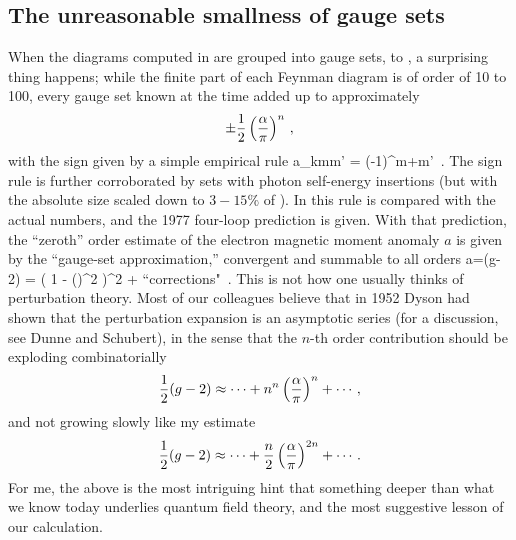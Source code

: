 \subsection{The unreasonable smallness of gauge sets}
\label{sect:gaugeSetsSmall}

When the diagrams computed in  are grouped into
gauge sets,  to ,
a surprising thing happens; while the
finite part of each Feynman diagram is of order of 10 to 100, every
 gauge set known at the time added up to approximately
$$
		   \pm {1 \over 2} \left(\frac{\alpha}{\pi}\right)^n
\,,
$$
with the sign given by a simple empirical rule
\beq
a_{kmm'} = (-1)^{m+m'}
\,.
The sign rule is further corroborated by sets with photon
self-energy insertions (but with the absolute size scaled down to
$3-15\%$ of ).
In  this rule is compared with the actual numbers,
and the 1977 four-loop prediction is given.
With that prediction, the ``zeroth'' order estimate of the electron
magnetic moment anomaly $a$ is given by the ``gauge-set
approximation,'' convergent and summable to all orders
\beq
a=(g-2) =   \frac{\alpha}{\pi}
           {\left( 1 - \left(\frac{\alpha}{\pi}\right)^2
			\right)^2
		      } + \mbox{``corrections"}
\,.
This is not how one usually thinks of perturbation theory. Most of our
colleagues believe that in 1952 Dyson had  shown that the
perturbation expansion is an asymptotic series (for a discussion, see
Dunne and Schubert), in the sense that the $n$-th order
contribution should be exploding combinatorially
$$
{1 \over 2} (g-2) \approx
\cdots + n^n \left(\frac{\alpha}{\pi}\right)^n + \cdots
\,,
$$
and not growing slowly like my estimate
\[
{1 \over 2} (g-2) \approx
\cdots + \frac{n}{2}\left(\frac{\alpha}{\pi}\right)^{2n} + \cdots
\,.
\]
For me, the above is the most intriguing hint that something deeper than
what we know today underlies quantum field theory, and the most suggestive
lesson of our calculation.

